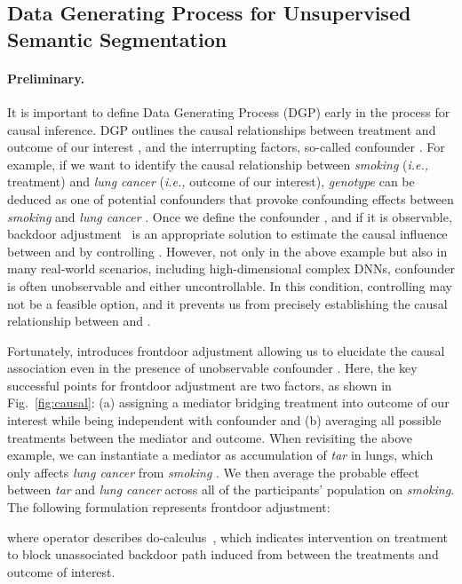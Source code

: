 \documentclass{article} \usepackage{iclr2024_conference,times}
\begin{document}
\subsection{Data Generating Process for Unsupervised Semantic Segmentation}
\label{sec:dgp}
\paragraph{Preliminary.} It is important to define Data Generating Process (DGP) early in the process for causal inference. DGP outlines the causal relationships between treatment  and outcome of our interest , and the interrupting factors, so-called confounder . For example, if we want to identify the causal relationship between \textit{smoking} (\textit{i.e.,} treatment) and \textit{lung cancer} (\textit{i.e.,} outcome of our interest), \textit{genotype} can be deduced as one of potential confounders that provoke confounding effects between \textit{smoking}  and \textit{lung cancer} .
Once we define the confounder , and if it is observable, backdoor adjustment~\citep{pearl1993bayesian} is an appropriate solution to estimate the causal influence between  and  by controlling . However, not only in the above example but also in many real-world scenarios, including high-dimensional complex DNNs, confounder is often unobservable and either uncontrollable. In this condition, controlling  may not be a feasible option, and it prevents us from precisely establishing the causal relationship between  and .

Fortunately, \citet{pearl2009causality} introduces frontdoor adjustment allowing us to elucidate the causal association even in the presence of unobservable confounder . Here, the key successful points for frontdoor adjustment are two factors, as shown in Fig.~\ref{fig:causal}: (a) assigning a mediator  bridging treatment  into outcome of our interest  while being independent with confounder  and (b) averaging all possible treatments between the mediator and outcome. When revisiting the above example, we can instantiate a mediator  as accumulation of \textit{tar} in lungs, which only affects \textit{lung cancer}  from \textit{smoking} . We then average the probable effect between \textit{tar}  and \textit{lung cancer}  across all of the participants' population  on \textit{smoking}. The following formulation represents frontdoor adjustment:

where  operator describes do-calculus~\citep{pearl1995causal}, which indicates intervention on treatment  to block unassociated backdoor path induced from  between the treatments and outcome of interest.
\end{document}
